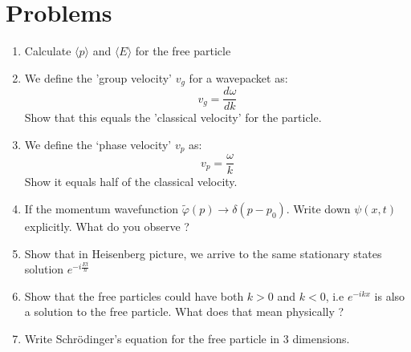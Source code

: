 \section{Problems}
  \begin{enumerate}
  	\item Calculate $\langle p\rangle$  and  $\langle E\rangle$ for the free particle 
  	\item We define the 'group velocity' $ v_g$ for a wavepacket as:
  	\[
  	v_g = \frac{d \omega}{dk}
  	\]
  	Show that this equals the 'classical velocity' for the particle.
  	\item We define the `phase velocity' $ v_p$ as:
  	\[
  	v_p =\frac{ \omega}{  k}
  	\]
  	Show it equals half of the classical velocity.
  	\item If the momentum wavefunction $ \tilde{\varphi}(p) \rightarrow \delta(p-p_0)$. Write down $\psi(x,t)$ explicitly. What do you observe ?
  	\item Show that in Heisenberg picture, we arrive to the same stationary states solution $ e^{-i \frac{E t}{\hbar}}$
  	\item Show that the free particles could have both $ k>0$ and $ k<0$, i.e $ e^ {-ikx}$ is also a solution to the free particle. What does that mean physically ?
  	\item Write Schr\"{o}dinger's equation for the free particle in 3 dimensions. 
  \end{enumerate}
  \nocite{*} 